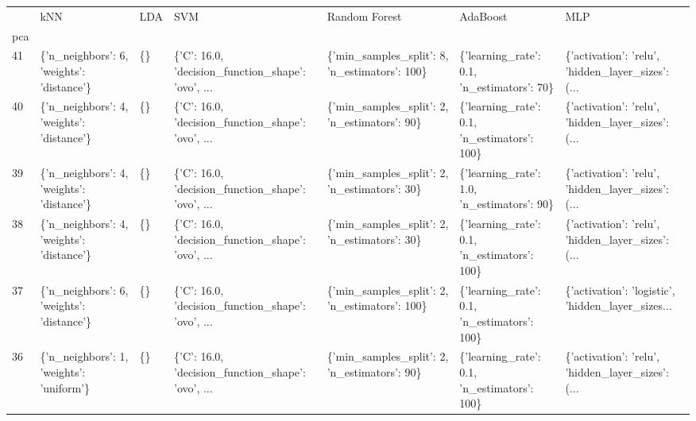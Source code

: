 \begin{tabular}{lllllll}
\toprule
{} &                                        kNN & LDA &                                                SVM &                                  Random Forest &                                     AdaBoost &                                                MLP \\
pca &                                            &     &                                                    &                                                &                                              &                                                    \\
\midrule
41  &  \{'n\_neighbors': 6, 'weights': 'distance'\} &  \{\} &  \{'C': 16.0, 'decision\_function\_shape': 'ovo', ... &  \{'min\_samples\_split': 8, 'n\_estimators': 100\} &   \{'learning\_rate': 0.1, 'n\_estimators': 70\} &  \{'activation': 'relu', 'hidden\_layer\_sizes': (... \\
40  &  \{'n\_neighbors': 4, 'weights': 'distance'\} &  \{\} &  \{'C': 16.0, 'decision\_function\_shape': 'ovo', ... &   \{'min\_samples\_split': 2, 'n\_estimators': 90\} &  \{'learning\_rate': 0.1, 'n\_estimators': 100\} &  \{'activation': 'relu', 'hidden\_layer\_sizes': (... \\
39  &  \{'n\_neighbors': 4, 'weights': 'distance'\} &  \{\} &  \{'C': 16.0, 'decision\_function\_shape': 'ovo', ... &   \{'min\_samples\_split': 2, 'n\_estimators': 30\} &   \{'learning\_rate': 1.0, 'n\_estimators': 90\} &  \{'activation': 'relu', 'hidden\_layer\_sizes': (... \\
38  &  \{'n\_neighbors': 4, 'weights': 'distance'\} &  \{\} &  \{'C': 16.0, 'decision\_function\_shape': 'ovo', ... &   \{'min\_samples\_split': 2, 'n\_estimators': 30\} &  \{'learning\_rate': 0.1, 'n\_estimators': 100\} &  \{'activation': 'relu', 'hidden\_layer\_sizes': (... \\
37  &  \{'n\_neighbors': 6, 'weights': 'distance'\} &  \{\} &  \{'C': 16.0, 'decision\_function\_shape': 'ovo', ... &  \{'min\_samples\_split': 2, 'n\_estimators': 100\} &  \{'learning\_rate': 0.1, 'n\_estimators': 100\} &  \{'activation': 'logistic', 'hidden\_layer\_sizes... \\
36  &   \{'n\_neighbors': 1, 'weights': 'uniform'\} &  \{\} &  \{'C': 16.0, 'decision\_function\_shape': 'ovo', ... &   \{'min\_samples\_split': 2, 'n\_estimators': 90\} &  \{'learning\_rate': 0.1, 'n\_estimators': 100\} &  \{'activation': 'relu', 'hidden\_layer\_sizes': (... \\

\end{tabular}
